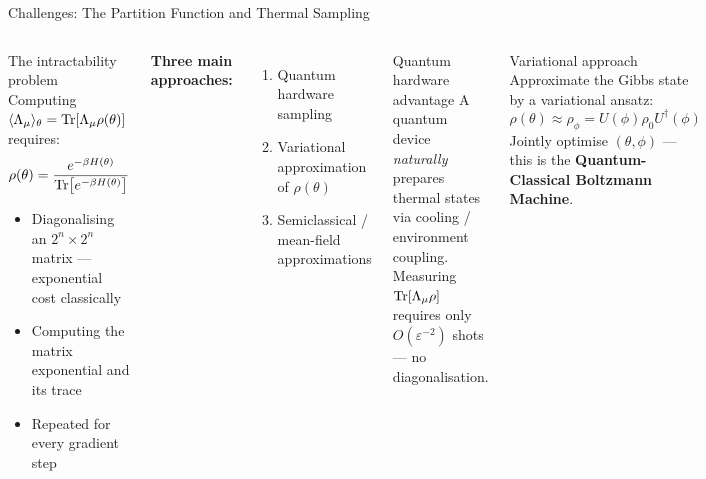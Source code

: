 \documentclass[aspectratio=169,10pt]{beamer}
\begin{document}
\begin{frame}{Challenges: The Partition Function and Thermal Sampling}
  \begin{columns}[T]
      \begin{alertblock}{The intractability problem}
        Computing $\langle\Lambda_\mu\rangle_\theta = \Tr[\Lambda_\mu\rho(\theta)]$
        requires:
        \[
          \rho(\theta) = \frac{e^{-\beta H(\theta)}}{\Tr[e^{-\beta H(\theta)}]}
        \]
        \begin{itemize}
          \item Diagonalising an $2^n\times 2^n$ matrix —
                exponential cost classically
          \item Computing the matrix exponential and its trace
          \item Repeated for every gradient step
        \end{itemize}
      \end{alertblock}

      \textbf{Three main approaches:}
      \begin{enumerate}
        \item Quantum hardware sampling
        \item Variational approximation of $\rho(\theta)$
        \item Semiclassical / mean-field approximations
      \end{enumerate}
      \begin{block}{Quantum hardware advantage}
        A quantum device \emph{naturally} prepares thermal
        states via cooling / environment coupling.
        Measuring $\Tr[\Lambda_\mu\rho]$ requires only
        $O(\varepsilon^{-2})$ shots — no diagonalisation.
      \end{block}
      \vspace{0.3cm}
      \begin{block}{Variational approach}
        Approximate the Gibbs state by a variational ansatz:
        \[
          \rho(\theta)\approx\rho_\phi
          = U(\phi)\rho_0 U^\dagger(\phi)
        \]
        Jointly optimise $(\theta,\phi)$ — this is the
        \textbf{Quantum-Classical Boltzmann Machine}.
      \end{block}
  \end{columns}
\end{frame}
\end{document}
